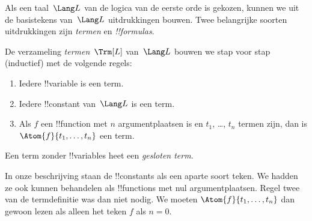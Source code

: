 \documentclass[openany]{memoir}
\begin{document}


Als een taal~$\Lang L$ van de logica van de eerste orde is gekozen,
kunnen we uit de basistekens van~$\Lang L$ uitdrukkingen bouwen. Twee
belangrijke soorten uitdrukkingen zijn \emph{termen} en
\emph{!!{formula}s}.

\begin{defn}[Termen]
De verzameling \emph{termen}~$\Trm[L]$ van~$\Lang L$ bouwen we stap
voor stap (inductief) met de volgende regels:
\begin{enumerate}
\item Iedere !!{variable} is een term.
\item Iedere !!{constant} van~$\Lang L$ is een term.
\item Als $f$ een !!{function} met $n$ argumentplaatsen is en $t_1$,
  \dots, $t_n$ termen zijn, dan is $\Atom{f}{t_1, \ldots, t_n}$ een
  term.
\end{enumerate}
Een term zonder !!{variable}s heet een \emph{gesloten term}.
\end{defn}

\begin{explain}
In onze beschrijving staan de !!{constant}s als een aparte soort teken.
We hadden ze ook kunnen behandelen als !!{function}s met nul
argumentplaatsen. Regel twee van de termdefinitie was dan niet nodig.
We moeten $\Atom{f}{t_1, \ldots, t_n}$ dan gewoon lezen als alleen het
teken $f$ als $n = 0$.
\end{explain}
\end{document}
